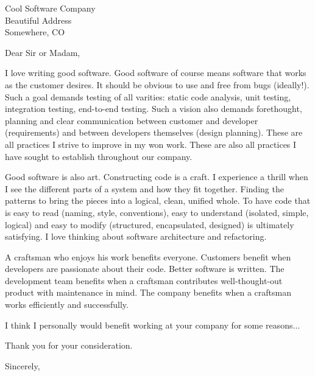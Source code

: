 \documentclass{letter}
\begin{document}
\address{Nathanael Thompson\\1102 Lincolnshire Drive\\Champaign, IL 61821\\nat@alumni.brown.edu\\(469)
230-7125 (Mobile)}
\signature{Nathanael Thompson}
\begin{letter}{Cool Software Company\\Beautiful Address\\Somewhere, CO}

\opening{Dear Sir or Madam,}
I love writing good software.  Good software of course means software that works
as the customer desires.  It should be obvious to use and free from bugs
(ideally!).  Such a goal demands testing of all varities: static code analysis,
unit testing, integration testing, end-to-end testing.  Such a vision also
demands forethought, planning and clear communication between customer and
developer (requirements) and between developers themselves (design planning).
These are all practices I strive to improve in my won work.  These are also all
practices I have sought to establish throughout our company.

Good software is also art.  Constructing code is a craft.  I experience a thrill
when I see the different parts of a system and how they fit together.  Finding
the patterns to bring the pieces into a logical, clean, unified whole.  To have
code that is easy to read (naming, style, conventions), easy to understand
(isolated, simple, logical) and easy to modify (structured, encapsulated,
designed) is ultimately satisfying.  I love thinking about software architecture
and refactoring.

A craftsman who enjoys his work benefits everyone.  Customers benefit when
developers are passionate about their code.  Better software is written.  The
development team benefits when a craftsman contributes well-thought-out product
with maintenance in mind.  The company benefits when a craftsman works
efficiently and successfully.

I think I personally would benefit working at your company for some reasons...

Thank you for your consideration.

\closing{Sincerely,}
\end{letter}
\end{document}
